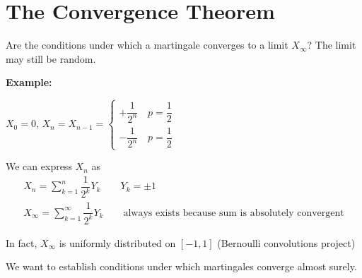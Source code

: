 \section{The Convergence Theorem}
Are the conditions under which a martingale converges to a limit $X_{\infty}$? The limit may still be random.
\par\bigskip
\noindent\textbf{Example:}\par
\noindent $X_0=0$, $X_n = X_{n-1} = \begin{cases}
  +\dfrac{1}{2^n}\quad p = \dfrac{1}{2}\\-\dfrac{1}{2^n}\quad p = \dfrac{1}{2}
\end{cases}$
\par\bigskip
\noindent We can express $X_n$ as
\begin{equation*}
  \begin{gathered}
    X_n = \sum_{k=1}^{n}\dfrac{1}{2^k} Y_k\qquad Y_k = \pm1\\
    X_{\infty} = \sum_{k=1}^{\infty}\dfrac{1}{2^k}Y_k\qquad\text{always exists because sum is absolutely convergent}
  \end{gathered}
\end{equation*}\par
\noindent In fact, $X_{\infty}$ is uniformly distributed on $[-1,1]$ (Bernoulli convolutions project)
\par\bigskip
\noindent We want to establish conditions under which martingales converge almost surely.
\par\bigskip
